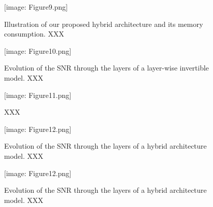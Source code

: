 \documentclass[twocolumn]{bmcart}
\def\texttt{[image: ]}
\begin{document}
\begin{backmatter}
\begin{figure}[t]
\texttt{[image: Figure9.png]}
\caption{
Illustration of our proposed hybrid architecture and its memory consumption. 
XXX
}
\end{figure}

\begin{figure}[t]
\texttt{[image: Figure10.png]}
\caption{
Evolution of the SNR through the layers of a layer-wise invertible model.
XXX
}
\end{figure}

\begin{figure}[t]
\texttt{[image: Figure11.png]}
\caption{
XXX
}
\end{figure}

\begin{figure}[t]
\texttt{[image: Figure12.png]}
\caption{
Evolution of the SNR through the layers of a hybrid architecture model.
XXX
}
\end{figure}



\begin{figure}[t]
\texttt{[image: Figure12.png]}
\caption{
Evolution of the SNR through the layers of a hybrid architecture model.
XXX
}
\end{figure}
\end{backmatter}
\end{document}
